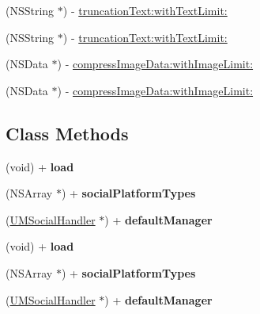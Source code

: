 \begin{DoxyCompactItemize}
\item 
(N\+S\+String $\ast$) -\/ \mbox{\hyperlink{interface_u_m_social_handler_ae19a28003b6af6039dc68c0b465386c0}{truncation\+Text\+:with\+Text\+Limit\+:}}
\item 
(N\+S\+String $\ast$) -\/ \mbox{\hyperlink{interface_u_m_social_handler_ae19a28003b6af6039dc68c0b465386c0}{truncation\+Text\+:with\+Text\+Limit\+:}}
\item 
(N\+S\+Data $\ast$) -\/ \mbox{\hyperlink{interface_u_m_social_handler_a240f1107abc2ef1e2d139535551a4f36}{compress\+Image\+Data\+:with\+Image\+Limit\+:}}
\item 
(N\+S\+Data $\ast$) -\/ \mbox{\hyperlink{interface_u_m_social_handler_a240f1107abc2ef1e2d139535551a4f36}{compress\+Image\+Data\+:with\+Image\+Limit\+:}}
\end{DoxyCompactItemize}
\subsection*{Class Methods}
\begin{DoxyCompactItemize}
\item 
\mbox{\label{interface_u_m_social_handler_ab19394500243e3aafe35d1f66f883371}} 
(void) + {\bfseries load}
\item 
\mbox{\label{interface_u_m_social_handler_a67493f2d819095f234cd2f84f3c4a774}} 
(N\+S\+Array $\ast$) + {\bfseries social\+Platform\+Types}
\item 
\mbox{\label{interface_u_m_social_handler_a65d432716d3cf3ebb2547fa2624aea0b}} 
(\mbox{\hyperlink{interface_u_m_social_handler}{U\+M\+Social\+Handler}} $\ast$) + {\bfseries default\+Manager}
\item 
\mbox{\label{interface_u_m_social_handler_ab19394500243e3aafe35d1f66f883371}} 
(void) + {\bfseries load}
\item 
\mbox{\label{interface_u_m_social_handler_a67493f2d819095f234cd2f84f3c4a774}} 
(N\+S\+Array $\ast$) + {\bfseries social\+Platform\+Types}
\item 
\mbox{\label{interface_u_m_social_handler_a65d432716d3cf3ebb2547fa2624aea0b}} 
(\mbox{\hyperlink{interface_u_m_social_handler}{U\+M\+Social\+Handler}} $\ast$) + {\bfseries default\+Manager}
\end{DoxyCompactItemize}
